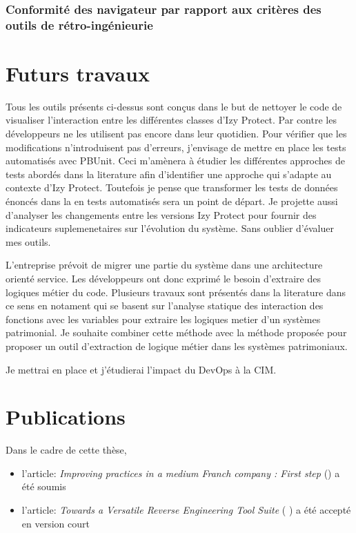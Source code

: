 \documentclass[a4paper]{article}
\begin{document}
\subsubsection{Conformité des navigateur par rapport aux critères des outils de rétro-ingénieurie}


\section{Futurs travaux}
\label{sec:roadmap}
Tous les outils présents ci-dessus sont conçus dans le but de nettoyer le code de visualiser l'interaction entre les différentes classes d'Izy Protect.
Par contre les développeurs ne les utilisent pas encore dans leur quotidien.
Pour vérifier que  les modifications n'introduisent pas d'erreurs, j'envisage de mettre en place les tests automatisés avec PBUnit. 
Ceci m'amènera à étudier les différentes approches de tests abordés dans la literature afin d'identifier une approche qui s'adapte au contexte d'Izy Protect. 
Toutefois je pense que transformer les tests de données énoncés dans la  en tests automatisés sera un point de départ. 
Je projette aussi d'analyser  les changements entre les versions Izy Protect pour fournir des indicateurs suplemenetaires sur l'évolution du système.
Sans oublier d'évaluer mes outils. 

L'entreprise prévoit de migrer une partie du système dans une architecture orienté service. 
Les développeurs ont donc exprimé le besoin d'extraire des logiques métier du code.
Plusieurs travaux sont présentés dans la literature dans ce sens en notament \cite{Lei05a,Cose12a,Norm12a} qui se basent sur l'analyse statique des interaction des fonctions avec les variables pour extraire les logiques metier d'un systèmes patrimonial. 
Je souhaite combiner cette méthode avec la méthode proposée \cite{anqu19a} pour proposer un outil d'extraction de logique métier dans les systèmes patrimoniaux.

Je mettrai en place et j'étudierai l'impact du DevOps à la CIM. 

\section{Publications}
Dans le cadre de cette thèse,
\begin{itemize}
  \item l'article: \textit{Improving practices in a medium Franch company : First step} (\citet{Houe20a}) a été soumis
\item l'article: \textit{Towards a Versatile Reverse Engineering Tool Suite}  ( \citet{Houe20b}) a été accepté en version court
\end{itemize}
\end{document}
